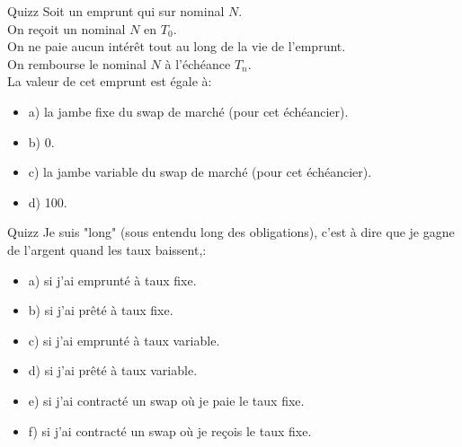 \documentclass{beamer}
\begin{document}
\begin{frame}{Quizz}
Soit un emprunt qui sur nominal $N$.\\ 
On reçoit un nominal $N$ en $T_0$.\\
On ne paie aucun intérêt tout au long de la vie de l'emprunt.\\
On rembourse le nominal $N$ à l'échéance $T_n$.\\
\vspace{0.5cm}
La valeur de cet emprunt est égale à:
\begin{itemize}
\item a) la jambe fixe du swap de marché (pour cet échéancier).
\item b) 0.
\item c) la jambe variable du swap de marché (pour cet échéancier).
\item d) 100.
\end{itemize}
\end{frame}

\begin{frame}{Quizz}
Je suis "long" (sous entendu long des obligations), c'est à dire que je gagne de l'argent quand les taux baissent,:
\begin{itemize}
\item a) si j'ai emprunté à taux fixe.
\item b) si j'ai prêté à taux fixe.
\item c) si j'ai emprunté à taux variable.
\item d) si j'ai prêté à taux variable.
\item e) si j'ai contracté un swap où je paie le taux fixe.
\item f) si j'ai contracté un swap où je reçois le taux fixe.
\end{itemize}
\end{frame}
\end{document}
